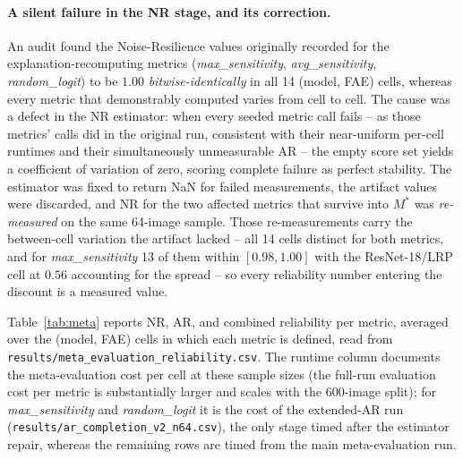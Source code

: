 \paragraph{A silent failure in the NR stage, and its correction.}
An audit found the Noise-Resilience values originally recorded for the
explanation-recomputing metrics (\emph{max\_sensitivity},
\emph{avg\_sensitivity}, \emph{random\_logit}) to be $1.00$
\emph{bitwise-identically} in all 14 (model, FAE) cells, whereas every
metric that demonstrably computed varies from cell to cell. The cause was a
defect in the NR estimator: when every seeded metric call fails -- as those
metrics' calls did in the original run, consistent with their near-uniform
per-cell runtimes and their simultaneously unmeasurable AR -- the empty score
set yields a coefficient of variation of zero, scoring complete failure as
perfect stability. The estimator was fixed to return NaN for failed
measurements, the artifact values were discarded, and NR for the two
affected metrics that survive into $M^{*}$ was \emph{re-measured} on the
same 64-image sample. Those re-measurements carry the between-cell variation
the artifact lacked -- all 14 cells distinct for both metrics, and for
\emph{max\_sensitivity} 13 of them within $[0.98, 1.00]$ with the
ResNet-18/LRP cell at $0.56$ accounting for the spread -- so every
reliability number entering the discount is a measured value.

Table~\ref{tab:meta} reports NR, AR, and combined reliability per metric,
averaged over the (model, FAE) cells in which each metric is defined, read from
\texttt{results/meta\_evaluation\_reliability.csv}. The runtime
column documents the meta-evaluation cost per cell at these sample sizes
(the full-run evaluation cost per metric is substantially larger and scales
with the 600-image split); for \emph{max\_sensitivity} and
\emph{random\_logit} it is the cost of the extended-AR run
(\texttt{results/ar\_completion\_v2\_n64.csv}), the only stage timed after
the estimator repair, whereas the remaining rows are timed from the main
meta-evaluation run.



